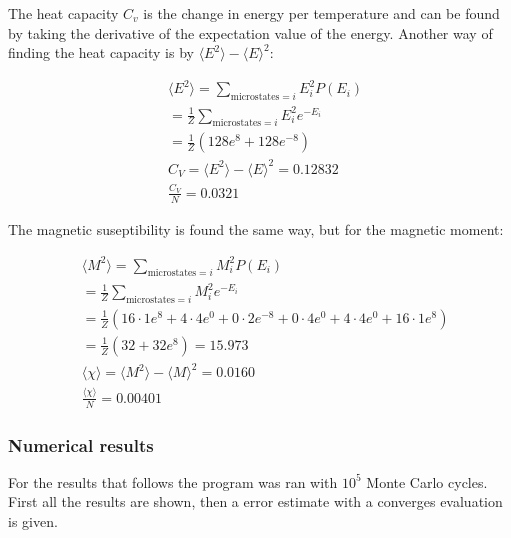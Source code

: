 The heat capacity $C_v$ is the change in energy per temperature and can be found by taking the derivative of the expectation value of the energy. Another way of finding the heat capacity is by $\langle E^2 \rangle - \langle E \rangle^2$:

\begin{align*}
    &\langle E^2 \rangle = \sum_{\text{microstates}=i} E_i^2P(E_i)\\
    &=\frac{1}{Z} \sum_{\text{microstates}=i} E_i^2 e^{-E_i}\\
    &=\frac{1}{Z} \left( 128 e^8 + 128 e^{-8} \right)\\
    &C_V = \langle E^2 \rangle - \langle E \rangle^2 = 0.12832\\ 
    &\frac{C_V}{N}= 0.0321
\end{align*}


The magnetic suseptibility is found the same way, but for the magnetic moment:

\begin{align*}
    &\langle M^2 \rangle = \sum_{\text{microstates}=i}M_i^2P(E_i)\\
    &= \frac{1}{Z} \sum_{\text{microstates}=i} M_i^2 e^{-E_i}\\
    &= \frac{1}{Z} \left(16\cdot1e^{8}+4\cdot4e^{0}+0\cdot2e^{-8}+
    0\cdot4e^{0}+4\cdot4e^{0}+16\cdot1e^{8}\right)\\
    &=\frac{1}{Z}\left(32+32e^{8}\right)=15.973\\
    &\langle \chi \rangle=\langle M^2 \rangle - \langle M \rangle^2 = 0.0160\\
    &\frac{\langle \chi \rangle}{N} = 0.00401
\end{align*}



\subsubsection{Numerical results}

For the results that follows the program was ran with $10^5$ Monte Carlo cycles. First all the results are shown, then a error estimate with a converges evaluation is given.





